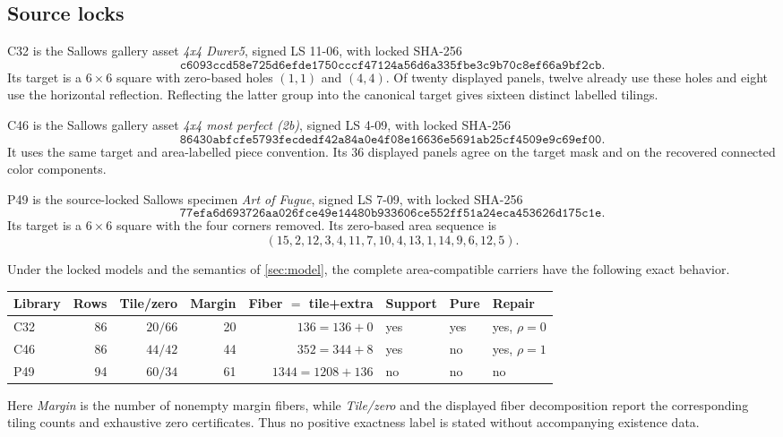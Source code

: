 \subsection{Source locks}

C32 is the Sallows gallery asset \emph{4x4 Durer5}, signed LS 11-06, with locked SHA-256
\[
\mathtt{c6093ccd58e725d6efde1750cccf47124a56d6a335fbe3c9b70c8ef66a9bf2cb}.
\]
Its target is a \(6\times6\) square with zero-based holes \((1,1)\) and
\((4,4)\).  Of twenty displayed panels, twelve already use these holes and
eight use the horizontal reflection.  Reflecting the latter group into the
canonical target gives sixteen distinct labelled tilings.

C46 is the Sallows gallery asset \emph{4x4 most perfect (2b)}, signed LS
4-09, with locked SHA-256
\[
\mathtt{86430abfcfe5793fecdedf42a84a0e4f08e16636e5691ab25cf4509e9c69ef00}.
\]
It uses the same target and area-labelled piece convention.  Its 36 displayed
panels agree on the target mask and on the recovered connected color
components.

P49 is the source-locked Sallows specimen \emph{Art of Fugue}, signed LS
7-09, with locked SHA-256
\[
\mathtt{77efa6d693726aa026fce49e14480b933606ce552ff51a24eca453626d175c1e}.
\]
Its target is a \(6\times6\) square with the four corners removed.  Its
zero-based area sequence is
\[
 (15,2,12,3,4,11,7,10,4,13,1,14,9,6,12,5).
\]

\begin{proposition}\label{prop:finite-panel}
Under the locked models and the semantics of \cref{sec:model}, the complete
area-compatible carriers have the following exact behavior.

\begin{center}
\small
\begin{tabular}{@{}lrrrrlll@{}}
\toprule
Library & Rows & Tile/zero & Margin & Fiber \(=\) tile+extra
& Support & Pure & Repair\\
\midrule
C32 & 86 & \(20/66\) & 20 & \(136=136+0\)
& yes & yes & yes, \(\rho=0\)\\
C46 & 86 & \(44/42\) & 44 & \(352=344+8\)
& yes & no & yes, \(\rho=1\)\\
P49 & 94 & \(60/34\) & 61 & \(1344=1208+136\)
& no & no & no\\
\bottomrule
\end{tabular}
\end{center}
\end{proposition}

Here \emph{Margin} is the number of nonempty margin fibers, while
\emph{Tile/zero} and the displayed fiber decomposition report the corresponding
tiling counts and exhaustive zero certificates.  Thus no positive exactness
label is stated without accompanying existence data.

